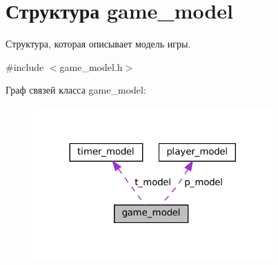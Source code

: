 \hypertarget{structgame__model}{}\section{Структура game\+\_\+model}
\label{structgame__model}


Структура, которая описывает модель игры.  




{\ttfamily \#include $<$game\+\_\+model.\+h$>$}



Граф связей класса game\+\_\+model\+:\nopagebreak
\begin{figure}[H]
\begin{center}
\leavevmode
\includegraphics[width=260pt]{structgame__model__coll__graph}
\end{center}
\end{figure}
